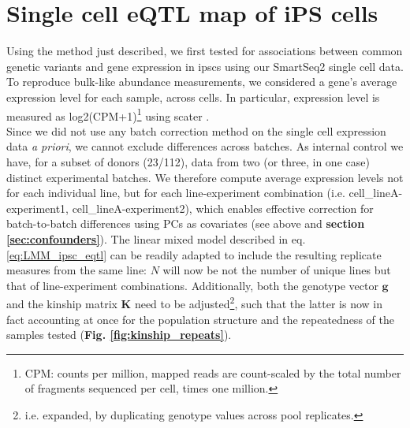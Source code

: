 
\section{Single cell eQTL map of iPS cells}
\label{sec:sc_ipsc_eqtl}

Using the method just described, we first tested for associations between common genetic variants and gene expression in \glspl{ipsc} using our SmartSeq2 single cell data.\\

To reproduce bulk-like abundance measurements, we considered a gene's average expression level for each sample, across cells.
In particular, expression level is measured as log2(CPM+1)\footnote{CPM: counts per million, mapped reads are count-scaled by the total number of fragments sequenced per cell, times one million.} using scater \cite{mccarthy2017scater}.
\\

Since we did not use any batch correction method on the single cell expression data \textit{a priori}, we cannot exclude differences across batches.
As internal control we have, for a subset of donors (23/112), data from two (or three, in one case) distinct experimental batches.
We therefore compute average expression levels not for each individual line, but for each line-experiment combination (i.e. cell\_lineA-experiment1, cell\_lineA-experiment2), which enables effective correction for batch-to-batch differences using PCs as covariates (see above and \textbf{section
\ref{sec:confounders}}).
The linear mixed model described in eq. \eqref{eq:LMM_ipsc_eqtl} can be readily adapted to include the resulting replicate measures from the same line: $N$ will now be not the number of unique lines but that of line-experiment combinations.
Additionally, both the genotype vector $\mathbf{g}$ and the kinship matrix $\mathbf{K}$ need to be adjusted\footnote{i.e. expanded, by duplicating genotype values across pool replicates.}, such that the latter is now in fact accounting at once for the population structure and the repeatedness of the samples tested (\textbf{Fig. \ref{fig:kinship_repeats}}). \\

